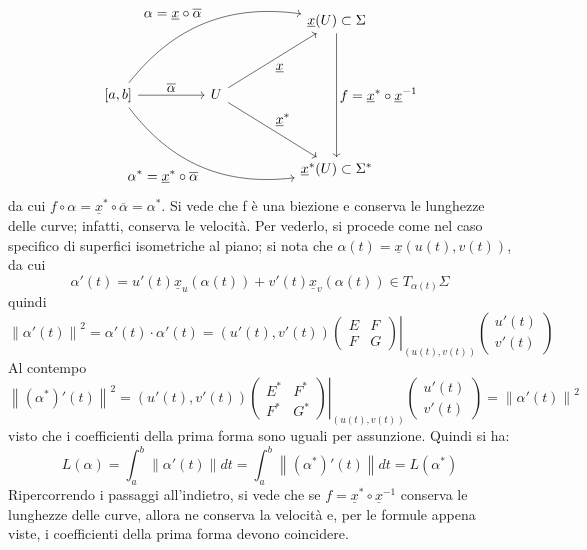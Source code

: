 \documentclass[12pt]{scrartcl}
\theoremstyle{style}
\newcommand*\Eval[3]{\left.#1\right\rvert_{#2}^{#3}}
\numberwithin{equation}{subsection}
\begin{document}
\[
\begin{tikzcd}
	& & & &  \underline{x}(U) \subset \Sigma\\
	\\
	\left[ a,b \right]  & & U \\
	\\
	& & & &  \underline{x}^*(U) \subset \Sigma^*
	\arrow[from=3-1, to=3-3, "\displaystyle \overline{\alpha}"]
	\arrow[from=3-3, to=1-5, "\displaystyle \underline{x}"']
	\arrow[from=3-3, to=5-5, "\displaystyle \underline{x}^*"]
	\arrow[from=3-1, to=1-5, bend left,"\displaystyle \alpha = \underline{x}\circ \overline{\alpha }"] 
	\arrow[from=3-1, to=5-5, bend right, "\displaystyle \alpha^* = \underline{x}^*\circ \overline{\alpha }"'] 
	\arrow[from=1-5, to=5-5, "\displaystyle f=\underline{x}^*\circ \underline{x}^{-1}"]
\end{tikzcd}
\] 
da cui $f \circ \alpha  = \underline{x}^* \circ \overline{\alpha } = \alpha ^*$.
Si vede che f \`e una biezione e conserva le lunghezze delle curve; infatti, conserva le velocit\`a. 
Per vederlo, si procede come nel caso specifico di superfici isometriche al piano; si nota che $\alpha (t) = \underline{x}(u(t),v(t))$, da cui
\[
\alpha '(t) = u'(t) \underline{x}_u(\alpha (t)) + v'(t) \underline{x}_v(\alpha (t)) \in T_{\alpha (t)} \Sigma
\] 
quindi
\[
	\left\lVert \alpha '(t) \right\rVert ^2 =\alpha '(t) \cdot \alpha '(t) = (u'(t),v'(t)) \Eval{\begin{pmatrix} E&F \\F&G \end{pmatrix}}{(u(t),v(t))}{} \begin{pmatrix} u'(t) \\ v'(t) \end{pmatrix} 
\] 
Al contempo
\[
\left\lVert (\alpha ^*)'(t) \right\rVert^2 = (u'(t),v'(t)) \Eval{\begin{pmatrix} E^*&F^* \\F^*&G^* \end{pmatrix}}{(u(t),v(t))}{} \begin{pmatrix} u'(t) \\ v'(t) \end{pmatrix} = \left\lVert \alpha '(t) \right\rVert ^2
\] 
visto che i coefficienti della prima forma sono uguali per assunzione.
Quindi si ha:
\[
L(\alpha ) = \int_{a} ^b \left\lVert \alpha '(t) \right\rVert dt = \int_{a} ^b \left\lVert (\alpha ^*)'(t) \right\rVert  dt = L(\alpha ^*)
\] 
Ripercorrendo i passaggi all'indietro, si vede che se $f = \underline{x}^* \circ \underline{x}^{-1}$ conserva le lunghezze delle curve, allora ne conserva la velocit\`a e, per le formule appena viste, i coefficienti della prima forma devono coincidere.
\end{document}
